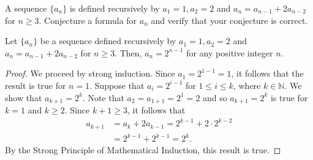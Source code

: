 \documentclass[12pt]{article}
\newcommand{\N}{\mathbb{N}}
\newenvironment{result}[2][Result]{\begin{trivlist}
			\item[\hskip \labelsep {\bfseries #1}\hskip \labelsep {\bfseries #2.}]}{\end{trivlist}}
\newenvironment{problem}[2][Problem]{\begin{trivlist}
		\item[\hskip \labelsep {\bfseries #1}\hskip \labelsep {\bfseries #2.}]}{\end{trivlist}}
\begin{document}
	\begin{problem}{42}
		A sequence $\{a_{n}\}$ is defined recursively by $a_{1} = 1, a_{2} = 2$ and $a_{n} = a_{n-1} +2a_{n-2}$ for $n\geq 3$. Conjecture a formula for $a_{n}$ and verify that your conjecture is correct.
		
		\begin{result}{}
			Let $\{a_{n}\}$ be a sequence defined recursively by $a_{1} = 1, a_{2} = 2$ and $a_{n} = a_{n-1} +2a_{n-2}$ for $n\geq 3$. Then, $a_{n} = 2^{n-1}$ for any positive integer $n$.
		\begin{proof}
				We proceed by strong induction. Since $a_{1} = 2^{1-1} = 1$, it follows that the result is true for $n=1$. Suppose that $a_{i} = 2^{i-1}$ for $1\leq i \leq k$, where $k\in \N$. We show that $a_{k+1} = 2^{k}$. Note that $a_{2} = a_{1+1} = 2^{1} = 2$ and so $a_{k+1} = 2^{k} $ is true for $k=1$ and $k\geq 2$. Since $k+1 \geq 3$, it follows that
				\begin{align*}
					a_{k+1} &= a_{k} + 2a_{k-1} = 2^{k-1} +2\cdot 2^{k-2}\\
					&= 2^{k-1} + 2^{k-1} = 2^{k}.
				\end{align*}
			By the Strong Principle of Mathematical Induction, this result is true.
		\end{proof}
		\end{result}
	\end{problem}
\end{document}
